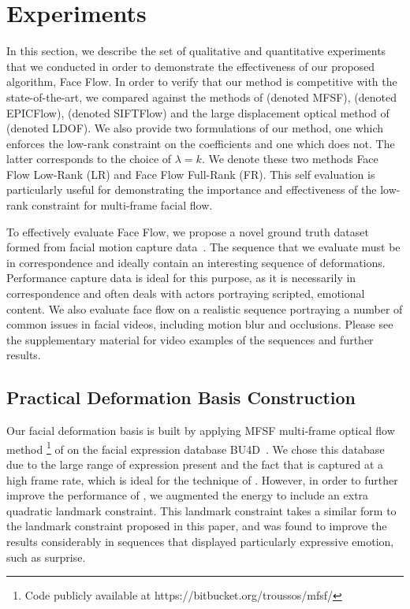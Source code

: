 \section{Experiments}\label{sec:experiments}
In this section, we describe the set of qualitative and quantitative experiments
that we conducted in order to demonstrate the effectiveness of our proposed algorithm,
Face Flow. In order to verify that our method is competitive with the state-of-the-art,
we compared against the methods of
\citet{Garg:2013hu} (denoted MFSF),
\citet{revaud2015epicflow} (denoted EPICFlow),
\citet{Liu:2011jv} (denoted SIFTFlow) and the large displacement
optical method of \citet{Brox:2011be} (denoted LDOF). We also provide two
formulations of our method, one which enforces the low-rank constraint on the coefficients
and one which does not. The latter corresponds to the choice of $\lambda=k$.
We denote these two methods Face Flow Low-Rank (LR) and Face Flow
Full-Rank (FR). This self evaluation is particularly useful for demonstrating the importance
and effectiveness of the low-rank constraint for multi-frame facial flow.

To effectively evaluate Face Flow, we propose a novel ground truth dataset formed
from facial motion capture data~\cite{zhang2008spacetime}. The sequence that we
evaluate must be in correspondence and ideally contain an interesting
sequence of deformations. Performance capture data is ideal for this purpose, as
it is necessarily in correspondence and often deals with actors portraying
scripted, emotional content. We also evaluate face flow on a realistic sequence
portraying a number of common issues in facial videos, including motion blur
and occlusions. Please see the supplementary material for
video examples of the sequences and further results.
\subsection{Practical Deformation Basis Construction}\label{subsec:experiments_basis}
Our facial deformation basis is built by applying MFSF multi-frame optical flow method
\footnote{Code publicly available at https://bitbucket.org/troussos/mfsf/} of \citet{Garg:2013hu} on
the facial expression database BU4D~\cite{bu4d}. We chose this database due
to the large range of expression present and the fact that is captured at a high
frame rate, which is ideal for the technique of \citet{Garg:2013hu}. However, in order
to further improve the performance of \citet{Garg:2013hu}, we augmented the energy
to include an extra quadratic landmark constraint. This landmark constraint
takes a similar form to the landmark constraint proposed in this paper, and was
found to improve the results considerably in sequences that displayed particularly
expressive emotion, such as surprise.

